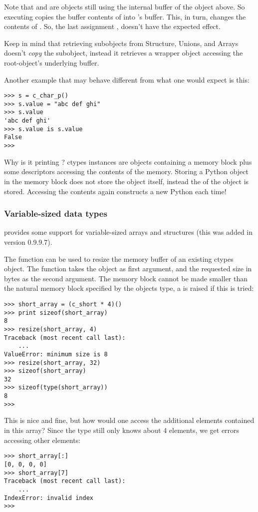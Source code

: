 Note that  and  are objects still using the internal
buffer of the  object above. So executing 
copies the buffer contents of  into  's buffer.  This,
in turn, changes the contents of . So, the last assignment
, doesn't have the expected effect.

Keep in mind that retrieving subobjects from Structure, Unions, and
Arrays doesn't \emph{copy} the subobject, instead it retrieves a wrapper
object accessing the root-object's underlying buffer.

Another example that may behave different from what one would expect is this:
\begin{verbatim}
>>> s = c_char_p()
>>> s.value = "abc def ghi"
>>> s.value
'abc def ghi'
>>> s.value is s.value
False
>>>
\end{verbatim}

Why is it printing ?  ctypes instances are objects containing
a memory block plus some descriptors accessing the contents of the
memory.  Storing a Python object in the memory block does not store
the object itself, instead the  of the object is stored.
Accessing the contents again constructs a new Python each time!


\subsubsection{Variable-sized data types\label{ctypes-variable-sized-data-types}}

 provides some support for variable-sized arrays and
structures (this was added in version 0.9.9.7).

The  function can be used to resize the memory buffer of an
existing ctypes object.  The function takes the object as first
argument, and the requested size in bytes as the second argument.  The
memory block cannot be made smaller than the natural memory block
specified by the objects type, a  is raised if this is
tried:
\begin{verbatim}
>>> short_array = (c_short * 4)()
>>> print sizeof(short_array)
8
>>> resize(short_array, 4)
Traceback (most recent call last):
    ...
ValueError: minimum size is 8
>>> resize(short_array, 32)
>>> sizeof(short_array)
32
>>> sizeof(type(short_array))
8
>>>
\end{verbatim}

This is nice and fine, but how would one access the additional
elements contained in this array?  Since the type still only knows
about 4 elements, we get errors accessing other elements:
\begin{verbatim}
>>> short_array[:]
[0, 0, 0, 0]
>>> short_array[7]
Traceback (most recent call last):
    ...
IndexError: invalid index
>>>
\end{verbatim}

